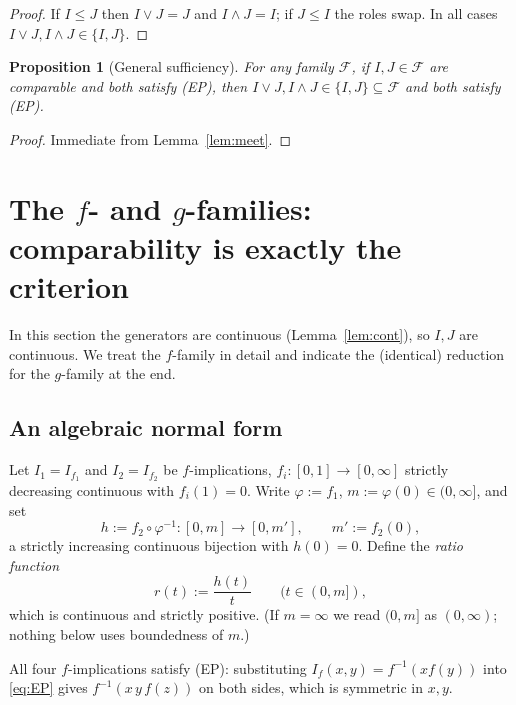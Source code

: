 \documentclass{amsart}
\theoremstyle{plain}
\newtheorem{proposition}{Proposition}
\theoremstyle{definition}
\newcommand{\Fcal}{\mathcal{F}}
\begin{document}
\begin{proof}
If $I\le J$ then $I\vee J=J$ and $I\wedge J=I$; if $J\le I$ the roles swap.  In all cases
$I\vee J,I\wedge J\in\{I,J\}$.
\end{proof}

\begin{proposition}[General sufficiency]\label{prop:suff}
For \emph{any} family $\Fcal$, if $I,J\in\Fcal$ are comparable and both satisfy
\textup{(EP)}, then $I\vee J,I\wedge J\in\{I,J\}\subseteq\Fcal$ and both satisfy
\textup{(EP)}.
\end{proposition}

\begin{proof}
Immediate from Lemma~\ref{lem:meet}.
\end{proof}

\section{The $f$- and $g$-families: comparability is exactly the criterion}\label{sec:fg}

In this section the generators are continuous (Lemma~\ref{lem:cont}), so $I,J$ are
continuous.  We treat the $f$-family in detail and indicate the (identical) reduction for
the $g$-family at the end.

\subsection{An algebraic normal form}

Let $I_1=I_{f_1}$ and $I_2=I_{f_2}$ be $f$-implications, $f_i\colon[0,1]\to[0,\infty]$
strictly decreasing continuous with $f_i(1)=0$.  Write $\varphi:=f_1$, $m:=\varphi(0)\in
(0,\infty]$, and set
\begin{equation}\label{eq:hdef}
h:=f_2\circ\varphi^{-1}\colon[0,m]\to[0,m'],\qquad m':=f_2(0),
\end{equation}
a strictly increasing continuous bijection with $h(0)=0$.  Define the \emph{ratio function}
\begin{equation}\label{eq:rdef}
r(t):=\frac{h(t)}{t}\qquad(t\in(0,m]),
\end{equation}
which is continuous and strictly positive.  (If $m=\infty$ we read $(0,m]$ as $(0,\infty)$;
nothing below uses boundedness of $m$.)

All four $f$-implications satisfy (EP): substituting $I_f(x,y)=f^{-1}(x f(y))$ into
\eqref{eq:EP} gives $f^{-1}(x\,y\,f(z))$ on both sides, which is symmetric in $x,y$.
\end{document}

